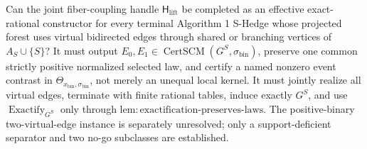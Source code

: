 Can the joint fiber-coupling handle \(\mathsf H_{\mathrm{lift}}\) be completed as an effective exact-rational constructor for every terminal Algorithm 1 S-Hedge whose projected forest uses virtual bidirected edges through shared or branching vertices of \(A_S\cup\{S\}\)? It must output \(E_0,E_1\in\operatorname{CertSCM}(G^S,\sigma_{\mathrm{bin}})\), preserve one common strictly positive normalized selected law, and certify a named nonzero event contrast in \(\Theta_{x_{\mathrm{bin}},\sigma_{\mathrm{bin}}}\), not merely an unequal local kernel. It must jointly realize all virtual edges, terminate with finite rational tables, induce exactly \(G^S\), and use \(\operatorname{Exactify}_{G^S}\) only through \(\mathrm{lem:exactification\text{-}preserves\text{-}laws}\). The positive-binary two-virtual-edge instance is separately unresolved; only a support-deficient separator and two no-go subclasses are established.